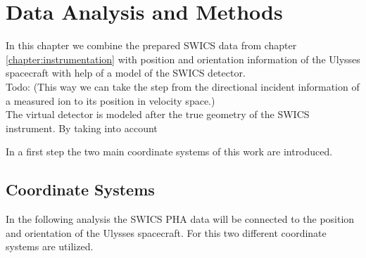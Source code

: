 
\chapter{Data Analysis and Methods} %

\label{chapter:data} 





In this chapter we combine the prepared SWICS data from chapter \ref{chapter:instrumentation} with position and orientation information of the Ulysses spacecraft with help of a model of the SWICS detector. \\
Todo: (This way we can take the step from the directional incident information of a measured ion to its position in velocity space.) \\

The virtual detector is modeled after the true geometry of the SWICS instrument. By taking into account 

In a first step the two main coordinate systems of this work are introduced.

\section{Coordinate Systems}
\label{sec:cs}
In the following analysis the SWICS PHA data will be connected to the position and orientation of the Ulysses spacecraft. For this two different coordinate systems are utilized.

%

